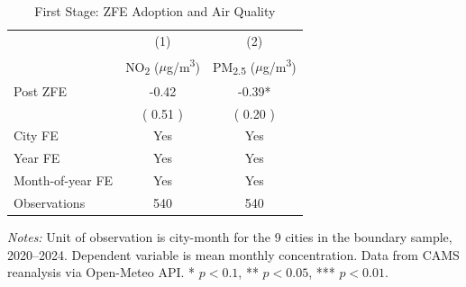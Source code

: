 \begin{table}[htbp]
\centering
\caption{First Stage: ZFE Adoption and Air Quality}
\label{tab:firststage}
\begin{tabular}{lcc}
\hline\hline
 & (1) & (2) \\
 & NO\textsubscript{2} ($\mu$g/m\textsuperscript{3}) & PM\textsubscript{2.5} ($\mu$g/m\textsuperscript{3}) \\
\hline
Post ZFE &  -0.42 &  -0.39* \\
  & ( 0.51 ) & ( 0.20 ) \\
\hline
City FE & Yes & Yes \\
Year FE & Yes & Yes \\
Month-of-year FE & Yes & Yes \\
Observations &  540 &  540 \\
\hline\hline
\end{tabular}
\begin{tablenotes}[flushleft]
\small \textit{Notes:} Unit of observation is city-month for the 9 cities in the boundary sample, 2020--2024. Dependent variable is mean monthly concentration. Data from CAMS reanalysis via Open-Meteo API. * $p<0.1$, ** $p<0.05$, *** $p<0.01$.
\end{tablenotes}
\end{table}
